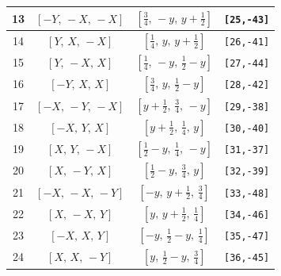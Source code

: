 \documentclass[fleqn,8pt]{jsarticle}
\begin{document}
\begin{longtable}{cccc}
13 & $\left[ - Y,\, - X,\, - X \right]$ & $\left[ \frac{3}{4},\, - y,\, y + \frac{1}{2} \right]$ & {\tt [25,-43]} \\ \hline
14 & $\left[ Y,\, X,\, - X \right]$ & $\left[ \frac{1}{4},\, y,\, y + \frac{1}{2} \right]$ & {\tt [26,-41]} \\ \hline
15 & $\left[ Y,\, - X,\, X \right]$ & $\left[ \frac{1}{4},\, - y,\, \frac{1}{2} - y \right]$ & {\tt [27,-44]} \\ \hline
16 & $\left[ - Y,\, X,\, X \right]$ & $\left[ \frac{3}{4},\, y,\, \frac{1}{2} - y \right]$ & {\tt [28,-42]} \\ \hline
17 & $\left[ - X,\, - Y,\, - X \right]$ & $\left[ y + \frac{1}{2},\, \frac{3}{4},\, - y \right]$ & {\tt [29,-38]} \\ \hline
18 & $\left[ - X,\, Y,\, X \right]$ & $\left[ y + \frac{1}{2},\, \frac{1}{4},\, y \right]$ & {\tt [30,-40]} \\ \hline
19 & $\left[ X,\, Y,\, - X \right]$ & $\left[ \frac{1}{2} - y,\, \frac{1}{4},\, - y \right]$ & {\tt [31,-37]} \\ \hline
20 & $\left[ X,\, - Y,\, X \right]$ & $\left[ \frac{1}{2} - y,\, \frac{3}{4},\, y \right]$ & {\tt [32,-39]} \\ \hline
21 & $\left[ - X,\, - X,\, - Y \right]$ & $\left[ - y,\, y + \frac{1}{2},\, \frac{3}{4} \right]$ & {\tt [33,-48]} \\ \hline
22 & $\left[ X,\, - X,\, Y \right]$ & $\left[ y,\, y + \frac{1}{2},\, \frac{1}{4} \right]$ & {\tt [34,-46]} \\ \hline
23 & $\left[ - X,\, X,\, Y \right]$ & $\left[ - y,\, \frac{1}{2} - y,\, \frac{1}{4} \right]$ & {\tt [35,-47]} \\ \hline
24 & $\left[ X,\, X,\, - Y \right]$ & $\left[ y,\, \frac{1}{2} - y,\, \frac{3}{4} \right]$ & {\tt [36,-45]} \\
\end{longtable}
\renewcommand{\arraystretch}{1.2}
\end{document}
